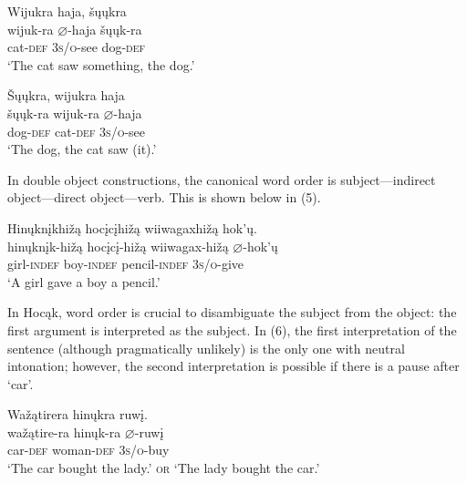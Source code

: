 \documentclass[output=paper]{LSP/langsci}
\begin{document}
\begin{exe}
\ex
\begin{xlist}

\ex \glll Wijukra  haja, šųųkra \\
 wijuk-ra {$\varnothing$}-haja  šųųk-ra\\
cat-\textsc{def}  \textsc{3s/o}-see dog-\textsc{def}\\
\glt `The cat saw something, the dog.' 

\ex \glll \v{S}ųųkra, wijukra haja  \\
 šųųk-ra wijuk-ra {$\varnothing$}-haja  \\
dog-\textsc{def} cat-\textsc{def}  \textsc{3s/o}-see \\
\glt `The dog, the cat saw (it).' 

\end{xlist}
\end{exe}

In double object constructions, the canonical word order is subject---indirect object---direct object---verb. This is shown below in (5).

\begin{exe}

\ex \glll Hinųknįkhižą hocįcįhižą wiiwagaxhižą hok'ų.\\
hinųknįk-hižą hocįcį-hižą wiiwagax-hižą {$\varnothing$}-hok'ų\\
girl-\textsc{indef} boy-\textsc{indef} pencil-\textsc{indef} \textsc{3s/o}-give\\
\glt `A girl gave a boy a pencil.'

\end{exe}

In Hocąk, word order is crucial to disambiguate the subject from the object: the first argument is interpreted as the subject. In (6), the first interpretation of the sentence (although pragmatically unlikely) is the only one with neutral intonation; however, the second interpretation is  possible if there is a pause after `car'.

\begin{exe}

\ex \glll Wažątirera hinųkra ruwį.\\
wažątire-ra hinųk-ra {$\varnothing$}-ruwį\\
car-\textsc{def} woman-\textsc{def} \textsc{3s/o}-buy\\
\glt `The car bought the lady.' \textsc{or} `The lady bought the car.'

\end{exe}
\end{document}
